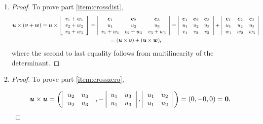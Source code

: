 \begin{enumerate}[!HW!, start=1]
\item \begin{proof} To prove part \ref{item:crossdist}, 
\begin{multline*}
\bb u \times (\bb v + \bb w) = \bb u \times \vr{v_1+w_1\\v_2+w_2\\v_3+w_3} = \dtx{ccc}{\bb e_1 & \bb e_2 & \bb e_3 \\ u_1 & u_2 & u_3 \\ v_1+w_1 & v_2+w_2 & v_3+w_3} =  \dtx{ccc}{\bb e_1 & \bb e_2 & \bb e_3 \\ u_1 & u_2 & u_3 \\ v_1 & v_2 & v_3} +  \dtx{ccc}{\bb e_1 & \bb e_2 & \bb e_3 \\ u_1 & u_2 & u_3 \\ w_1 & w_2 & w_3}\\ = (\bb u \times \bb v) + (\bb u \times \bb w),
\end{multline*} where the second to last equality follows from multilinearity of the determinant.
\end{proof}

\item \begin{proof} To prove part \ref{item:crosszero}, 

\[\bb u \times \bb u = \left( \dtx{cc}{ u_2 & u_3 \\ u_2 & u_3}, -\dtx{cc}{ u_1 & u_3 \\ u_1 & u_3}, \dtx{cc}{ u_1 & u_2 \\ u_1 & u_2}\right) = (0,-0,0) = \bb 0. \qedhere\]\vs
\end{proof}

\end{enumerate}
